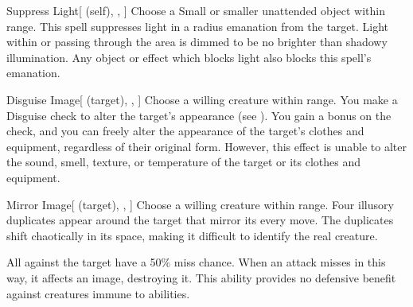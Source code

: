 \lowercase{\hypertarget{spell:Suppress Light}{}}\label{spell:Suppress Light}
\begin{ability}[\nth{1}]{\hypertarget{spell:Suppress Light}{Suppress Light}}[ (self), , ]
Choose a Small or smaller unattended object within \rngclose range.
This spell suppresses light in a \areamed radius emanation from the target.
Light within or passing through the area is dimmed to be no brighter than shadowy illumination.
Any object or effect which blocks light also blocks this spell's emanation.
\end{ability}
\vspace{0.25em}



\lowercase{\hypertarget{spell:Disguise Image}{}}\label{spell:Disguise Image}
\begin{ability}[\nth{2}]{\hypertarget{spell:Disguise Image}{Disguise Image}}[ (target), , ]
Choose a willing creature within \rngclose range.
You make a Disguise check to alter the target's appearance (see ).
You gain a  bonus on the check, and you can freely alter the appearance of the target's clothes and equipment, regardless of their original form.
However, this effect is unable to alter the sound, smell, texture, or temperature of the target or its clothes and equipment.
\end{ability}
\vspace{0.25em}



\lowercase{\hypertarget{spell:Mirror Image}{}}\label{spell:Mirror Image}
\begin{ability}[\nth{2}]{\hypertarget{spell:Mirror Image}{Mirror Image}}[ (target), , ]
Choose a willing creature within \rngclose range.
Four illusory duplicates appear around the target that mirror its every move.
The duplicates shift chaotically in its space, making it difficult to identify the real creature.

All   against the target have a 50\% miss chance.
When an attack misses in this way, it affects an image, destroying it.
This ability provides no defensive benefit against creatures immune to  abilities.
\end{ability}
\vspace{0.25em}



